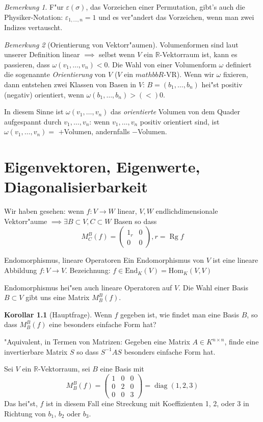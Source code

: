 \documentclass[fontsize=11pt,paper=a4,BCOR=0mm,DIV=11,automark,headsepline]{scrbook}
\DeclareMathOperator{\mRg}{Rg}
\DeclareMathOperator{\mDiag}{diag}
\theoremstyle{remark}
\theoremstyle{definition}
\newtheorem*{korollar}{Korollar}
\theoremstyle{proof}
\theoremstyle{remark}
\newtheorem*{bem}{Bemerkung}
\begin{document}
\begin{bem}
	F"ur \(\varepsilon(\sigma)\), das Vorzeichen einer Permutation, gibt's auch die Physiker-Notation: \(\varepsilon_{1,\dots,n}=1\) und es ver"andert das Vorzeichen, wenn man zwei Indizes vertauscht.
\end{bem}
\begin{bem}[Orientierung von Vektorr"aumen]
	Volumenformen sind laut unserer Definition linear \(\implies\) selbst wenn \(V\) ein \(\mathbb{R}\)-Vektorraum ist, kann es passieren, dass \(\omega(v_1,\dots,v_n)< 0\). Die Wahl von einer Volumenform \(\omega\) definiert die sogenannte \emph{Orientierung} von \(V\) (\(V\) ein \(mathbb{R}\)-VR). Wenn wir \(\omega\) fixieren, dann entstehen zwei Klassen von Basen in \(V\): \(B = (b_1,\dots,b_n)\) hei"st positiv (negativ) orientiert, wenn \(\omega(b_1,\dots,b_n) > (<) 0\). 
	
	In diesem Sinne ist \(\omega(v_1,\dots,v_n)\) das \emph{orientierte} Volumen von dem Quader aufgespannt durch \(v_1,\dots,v_n\): wenn \(v_1,\dots,v_n\) positiv orientiert sind, ist \(\omega(v_1,\dots,v_n) = \) \(+\)Volumen, andernfalls \(-\)Volumen.
\end{bem}

\chapter{Eigenvektoren, Eigenwerte, Diagonalisierbarkeit}

Wir haben gesehen: wenn \(f: V\to W\) linear, \(V, W\) endlichdimensionale Vektorr"aume \(\implies \exists B\subset V, C\subset W \) Basen so dass
\[M^B_C(f) = \begin{pmatrix}
1_r & 0\\
0 & 0
\end{pmatrix}, r = \mRg f\]

\begin{definition}{Endomorphismus, lineare Operatoren}{}
	Ein Endomorphismus von \(V\) ist eine lineare Abbildung \(f: V\to V\). Bezeichnung: \(f\in \text{End}_K(V) = \text{Hom}_K(V,V) \)	
	
	Endomorphismus hei"sen auch lineare Operatoren auf \(V\). Die Wahl einer Basis \(B\subset V \) gibt uns eine Matrix \(M^B_B(f)\).
\end{definition}
\begin{korollar}[Hauptfrage]
	Wenn \(f\) gegeben ist, wie findet man eine Basis \(B\), so dass \(M^B_B(f)\) eine besonders einfache Form hat?
	
	"Aquivalent, in Termen von Matrizen: Gegeben eine Matrix \(A\in K^{n\times n} \), finde eine invertierbare Matrix \(S\) so dass \(S^{-1}AS\) besonders einfache Form hat.
\end{korollar}
  Sei \(V\) ein \(\mathbb{R}\)-Vektorraum, sei \(B\) eine Basis mit \[M^B_B(f) =
    \begin{pmatrix}
      1 & 0 & 0 \\
      0 & 2 & 0 \\
      0 & 0 & 3
    \end{pmatrix} = \mDiag(1,2,3) \]
  Das hei"st, \(f\) ist in diesem Fall eine Streckung mit Koeffizienten 1, 2, oder 3 in Richtung von \(b_1\), \(b_2\) oder \(b_{3}\).
\end{document}
